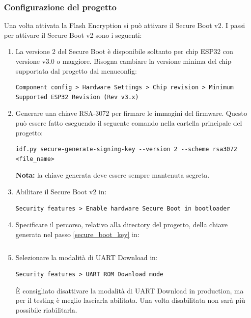 \documentclass[a4paper]{article}
\begin{document}
\subsubsection{Configurazione del progetto}
Una volta attivata la Flash Encryption si può attivare il Secure Boot v2.
I passi per attivare il Secure Boot v2 sono i seguenti:
\begin{enumerate}
  \item  La versione 2 del Secure Boot è disponibile soltanto per chip ESP32 con
    versione v3.0 o maggiore. Bisogna cambiare la versione minima del chip
    supportata dal progetto dal menuconfig:
\begin{lstlisting}
Component config > Hardware Settings > Chip revision > Minimum Supported ESP32 Revision (Rev v3.x)
\end{lstlisting}

  \item \label{secure_boot_key}
    Generare una chiave RSA-3072 per firmare le immagini del firmware. Questo può
    essere fatto eseguendo il seguente comando nella cartella principale del progetto:
\begin{lstlisting}
idf.py secure-generate-signing-key --version 2 --scheme rsa3072 <file_name>
\end{lstlisting}
   \textbf{Nota:} la chiave generata deve essere sempre mantenuta segreta.

  \item Abilitare il Secure Boot v2 in:
    \begin{lstlisting}
Security features > Enable hardware Secure Boot in bootloader
    \end{lstlisting}

  \item \label{secure_boot_key_path}
    Specificare il percorso, relativo alla directory del progetto, della chiave
    generata nel passo \ref{secure_boot_key} in:
\begin{lstlisting}

\end{lstlisting}

  \item Selezionare la modalità di UART Download in:
\begin{lstlisting}
Security features > UART ROM Download mode
\end{lstlisting}
    È consigliato disattivare la modalità di UART Download in production, ma per
    il testing è meglio lasciarla abilitata. Una volta disabilitata non sarà più possibile
    riabilitarla.


\end{enumerate}
\end{document}
